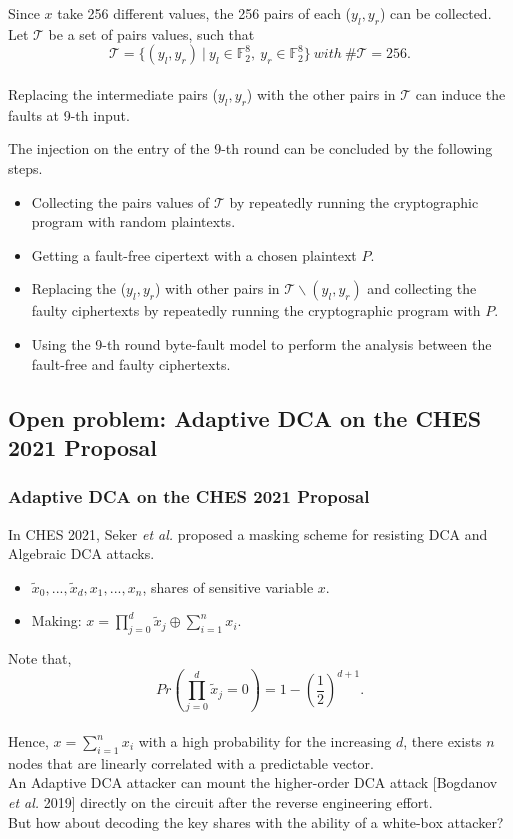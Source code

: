 \documentclass{beamer}
\begin{document}
\frame
{
	Since $x$ take 256 different values, the 256 pairs of each ($y_{l},y_{r}$) can be collected. 
	\\[2ex]
	Let $\mathcal{T}$ be a set of pairs values, such that
	\[\mathcal{T}=\{(y_{l},y_{r})\ |\ y_{l} \in \mathbb{F}_{2}^{8},\ y_{r} \in \mathbb{F}_{2}^{8}\}\ with\ \#\mathcal{T}=256.\]
	\\[2ex]
	Replacing the intermediate pairs ($y_{l},y_{r}$) with the other pairs in $\mathcal{T}$ can induce the faults at 9-th input.
}

\frame
{
	The injection on the entry of the 9-th round can be concluded by the following steps.
	\begin{itemize}
		\item Collecting the pairs values of $\mathcal{T}$ by repeatedly running the cryptographic program with random plaintexts.
		\item Getting a fault-free cipertext with a chosen plaintext $P$.
		\item Replacing the ($y_{l},y_{r}$) with other pairs in $\mathcal{T}\backslash(y_{l},y_{r})$ and collecting the faulty ciphertexts by repeatedly running the cryptographic program with $P$.
		\item Using the 9-th round byte-fault model to perform the analysis between the fault-free and faulty ciphertexts.
	\end{itemize}
}




\subsection{Open problem: Adaptive DCA on the CHES 2021 Proposal}
\frame
{ 
	\frametitle{Adaptive DCA on the CHES 2021 Proposal}
	In CHES 2021, Seker \textit{et al.} proposed a masking scheme for resisting DCA and Algebraic DCA attacks.
	\\[2ex]
	\begin{itemize}
		\item $\tilde{x}_0,...,\tilde{x}_d,x_1,...,x_n$, shares of sensitive variable $x$.
		\item Making: $x=\prod_{j=0}^{d}\tilde{x}_j\oplus \sum_{i=1}^{n}x_i$.
	\end{itemize}
}
\frame
{ 
	Note that,
	\[Pr(\prod_{j=0}^{d}\tilde{x}_j=0)=1-(\frac{1}{2})^{d+1}.\]
	\\[2ex]
	Hence, $x=\sum_{i=1}^{n}x_i$ with a high probability for the increasing $d$, there exists $n$ nodes that are linearly correlated with a predictable vector. 
	\\[2ex]
	An Adaptive DCA attacker can mount the higher-order DCA attack [Bogdanov \textit{et al.} 2019] directly on the circuit after the reverse engineering effort.
	\\[2ex]
	But how about decoding the key shares with the ability of a white-box attacker?
}
\end{document}
